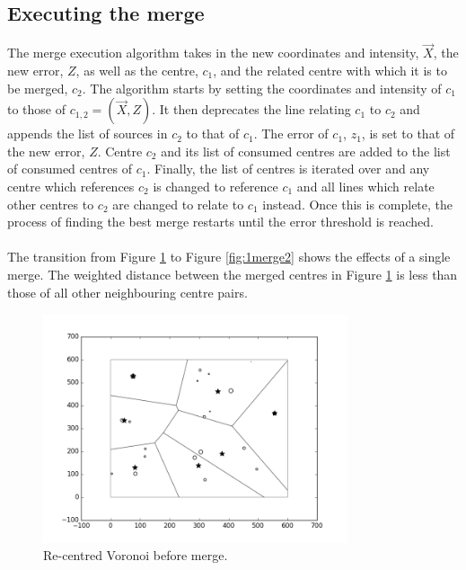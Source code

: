 \subsection{Executing the merge}
The merge execution algorithm takes in the new coordinates and intensity, $\vec{X}$, the new error, $Z$, as well as the centre, $c_1$, and the related centre with which it is to be merged, $c_2$. The algorithm starts by setting the coordinates and intensity of $c_1$ to those of $c_{1,2} = (\vec{X},Z)$. It then deprecates the line relating $c_1$ to $c_2$ and appends the list of sources in $c_2$ to that of $c_1$. The error of $c_1$, $z_1$, is set to that of the new error, $Z$. Centre $c_2$ and its list of consumed centres are added to the list of consumed centres of $c_1$. Finally, the list of centres is iterated over and any centre which references $c_2$ is changed to reference $c_1$ and all lines which relate other centres to $c_2$ are changed to relate to $c_1$ instead. Once this is complete, the process of finding the best merge restarts until the error threshold is reached.
\\
\\
The transition from Figure \ref{fig:1merge1} to Figure \ref{fig:1merge2} shows the effects of a single merge. The weighted distance between the merged centres in Figure \ref{fig:1merge1} is less than those of all other neighbouring centre pairs.
\begin{figure}[H]
  \centering
  \includegraphics[width=0.8\textwidth]{Images/1merge1.png}
  \caption{Re-centred Voronoi before merge.}
  \label{fig:1merge1}
\end{figure}

